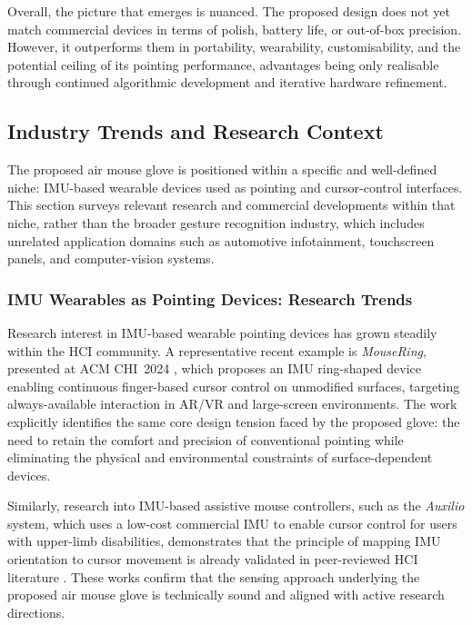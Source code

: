 Overall, the picture that emerges is nuanced. The proposed design does not yet match commercial devices in terms of polish, battery life, or out-of-box precision. However, it outperforms them in portability, wearability, customisability, and the potential ceiling of its pointing performance, advantages being only realisable through continued algorithmic development and iterative hardware refinement.

\subsection{Industry Trends and Research Context}

The proposed air mouse glove is positioned within a specific and well-defined niche: IMU-based wearable devices used as pointing and cursor-control interfaces. This section surveys relevant research and commercial developments within that niche, rather than the broader gesture recognition industry, which includes unrelated application domains such as automotive infotainment, touchscreen panels, and computer-vision systems.


\subsubsection{IMU Wearables as Pointing Devices: Research Trends}

Research interest in IMU-based wearable pointing devices has grown steadily within the HCI community. A representative recent example is \textit{MouseRing}, presented at ACM CHI~2024 \cite{acm_airmouse_interface}, which proposes an IMU ring-shaped device enabling continuous finger-based cursor control on unmodified surfaces, targeting always-available interaction in AR/VR and large-screen environments. The work explicitly identifies the same core design tension faced by the proposed glove: the need to retain the comfort and precision of conventional pointing while eliminating the physical and environmental constraints of surface-dependent devices.

Similarly, research into IMU-based assistive mouse controllers, such as the \textit{Auxilio} system, which uses a low-cost commercial IMU to enable cursor control for users with upper-limb disabilities, demonstrates that the principle of mapping IMU orientation to cursor movement is already validated in peer-reviewed HCI literature \cite{arxiv_gesture_recognition}. These works confirm that the sensing approach underlying the proposed air mouse glove is technically sound and aligned with active research directions.


